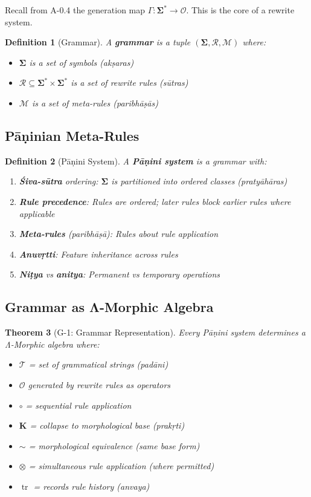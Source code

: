 \documentclass[12pt, oneside]{article}
\newtheorem{theorem}{Theorem}[section]
\newtheorem{definition}[theorem]{Definition}
\DeclareMathOperator{\tr}{tr}
\newcommand{\K}{\mathbf{K}}
\newcommand{\T}{\mathcal{T}}
\newcommand{\Opr}{\mathcal{O}}
\newcommand{\Sg}{\mathbf{\Sigma}}
\begin{document}
Recall from A-0.4 the generation map $\Gamma: \Sg^* \rightarrow \Opr$. This is the core of a rewrite system.

\begin{definition}[Grammar]
A \textbf{grammar} is a tuple $(\Sg, \mathcal{R}, \mathcal{M})$ where:
\begin{itemize}
    \item $\Sg$ is a set of symbols (akṣaras)
    \item $\mathcal{R} \subseteq \Sg^* \times \Sg^*$ is a set of rewrite rules (sūtras)
    \item $\mathcal{M}$ is a set of meta-rules (paribhāṣās)
\end{itemize}
\end{definition}

\subsection{Pāṇinian Meta-Rules}

\begin{definition}[Pāṇini System]
A \textbf{Pāṇini system} is a grammar with:
\begin{enumerate}
    \item \textbf{Śiva-sūtra} ordering: $\Sg$ is partitioned into ordered classes (pratyāhāras)
    \item \textbf{Rule precedence}: Rules are ordered; later rules block earlier rules where applicable
    \item \textbf{Meta-rules} (paribhāṣā): Rules about rule application
    \item \textbf{Anuvṛtti}: Feature inheritance across rules
    \item \textbf{Niṭya} vs \textbf{anitya}: Permanent vs temporary operations
\end{enumerate}
\end{definition}

\subsection{Grammar as Λ-Morphic Algebra}

\begin{theorem}[G-1: Grammar Representation]
Every Pāṇini system determines a Λ-Morphic algebra where:
\begin{itemize}
    \item $\T$ = set of grammatical strings (padāni)
    \item $\Opr$ generated by rewrite rules as operators
    \item $\circ$ = sequential rule application
    \item $\K$ = collapse to morphological base (prakṛti)
    \item $\sim$ = morphological equivalence (same base form)
    \item $\otimes$ = simultaneous rule application (where permitted)
    \item $\tr$ = records rule history (anvaya)
\end{itemize}
\end{theorem}
\end{document}
